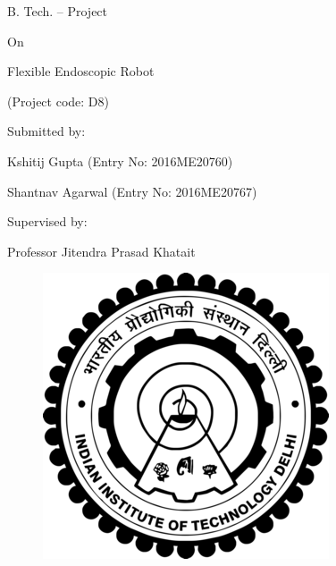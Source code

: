 \documentclass[12pt]{report}
\begin{document}
\begin{Center}
B. Tech. – Project
\end{Center}\par

\begin{Center}
On
\end{Center}\par

\begin{Center}
Flexible Endoscopic Robot
\end{Center}\par

\begin{Center}
(Project code: D8)
\end{Center}\par


\vspace{\baselineskip}
\begin{Center}
Submitted by:
\end{Center}\par

\begin{Center}
Kshitij Gupta (Entry No: 2016ME20760)
\end{Center}\par

\begin{Center}
Shantnav Agarwal (Entry No: 2016ME20767)
\end{Center}\par


\vspace{\baselineskip}
\begin{Center}
Supervised by:
\end{Center}\par

\begin{Center}
Professor Jitendra Prasad Khatait
\end{Center}\par




\begin{figure}[H]
	\begin{Center}
		\includegraphics[width=3.33in,height=3.33in]{./media/image1.png}
	\end{Center}
\end{figure}
\end{document}

